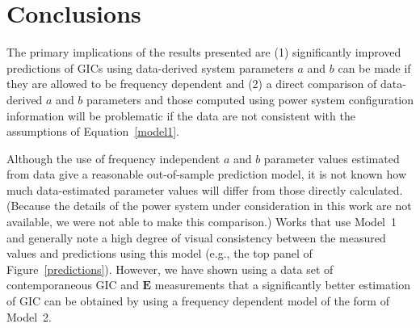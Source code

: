 \documentclass[draft,linenumbers]{agujournal2018}
\begin{document}



\section{Conclusions}

The primary implications of the results presented are (1) significantly improved predictions of GICs using data-derived system parameters $a$ and $b$ can be made if they are allowed to be frequency dependent and (2) a direct comparison of data-derived $a$ and $b$ parameters and those computed using power system configuration information will be problematic if the data are not consistent with the assumptions of Equation~\ref{model1}. 

Although the use of frequency independent $a$ and $b$ parameter values estimated from data give a reasonable out-of-sample prediction model, it is not known how much data-estimated parameter values will differ from those directly calculated. (Because the details of the power system under consideration in this work are not available, we were not able to make this comparison.) Works that use Model~1 and generally note a high degree of visual consistency between the measured values and predictions using this model (e.g., the top panel of Figure~\ref{predictions}). However, we have shown using a data set of contemporaneous GIC and $\mathbf{E}$ measurements that a significantly better estimation of GIC can be obtained by using a frequency dependent model of the form of Model~2. 
\end{document}
